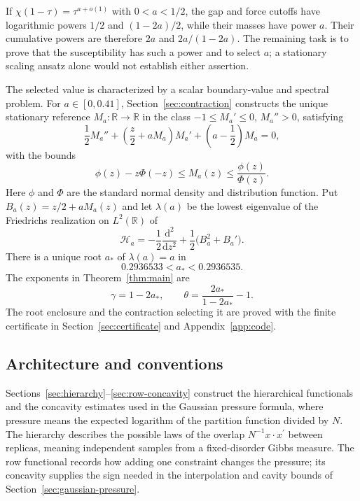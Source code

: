 \documentclass[11pt,a4paper]{article}
\numberwithin{equation}{section}
\theoremstyle{definition}
\theoremstyle{remark}
\newcommand{\R}{\mathbb R}
\newcommand{\dd}{\mathrm d}
\begin{document}
If $\chi(1-\tau)=\tau^{a+o(1)}$ with $0<a<1/2$, the gap and force
cutoffs have logarithmic powers $1/2$ and $(1-2a)/2$, while their masses
have power $a$. Their cumulative powers are therefore $2a$ and
$2a/(1-2a)$. The remaining task is to prove that the susceptibility has
such a power and to select $a$; a stationary scaling ansatz alone would
not establish either assertion.

The selected value is characterized by a scalar boundary-value and
spectral problem. For $a\in[0,0.41]$, Section~\ref{sec:contraction} constructs the unique stationary reference $M_a:\R\to\R$ in the class $-1\le M_a'\le0$, $M_a''>0$, satisfying
\begin{equation}\label{eq:intro-reference}
 \frac12M_a''+\left(\frac z2+aM_a\right)M_a'
                  +\left(a-\frac12\right)M_a=0,
\end{equation}
with the bounds
\[
 \phi(z)-z\Phi(-z)\le M_a(z)\le\frac{\phi(z)}{\Phi(z)}.
\]
Here $\phi$ and $\Phi$ are the standard normal density and distribution function. Put $B_a(z)=z/2+aM_a(z)$ and let $\lambda(a)$ be the lowest eigenvalue of the Friedrichs realization on $L^2(\R)$ of
\begin{equation}\label{eq:intro-spectral}
 \mathcal H_a=-\frac12\frac{\dd^2}{\dd z^2}
                  +\frac12\bigl(B_a^2+B_a'\bigr).
\end{equation}
There is a unique root $a_*$ of $\lambda(a)=a$ in
\begin{equation}\label{eq:intro-root-bracket}
 0.2936533<a_*<0.2936535.
\end{equation}
The exponents in Theorem~\ref{thm:main} are
\begin{equation}\label{eq:intro-exponents}
 \gamma=1-2a_*,\qquad
 \theta=\frac{2a_*}{1-2a_*}-1.
\end{equation}
The root enclosure and the contraction selecting it are proved with the finite certificate in Section~\ref{sec:certificate} and Appendix~\ref{app:code}.

\subsection{Architecture and conventions}
Sections~\ref{sec:hierarchy}--\ref{sec:row-concavity} construct the
hierarchical functionals and the concavity estimates used in the Gaussian
pressure formula, where pressure means the expected logarithm of the
partition function divided by $N$.  The hierarchy describes the possible
laws of the overlap $N^{-1}x\cdot x^{\prime}$ between replicas, meaning
independent samples from a fixed-disorder Gibbs measure.
The row functional records how adding one constraint changes the pressure;
its concavity supplies the sign needed in the interpolation and cavity
bounds of Section~\ref{sec:gaussian-pressure}.
\end{document}

